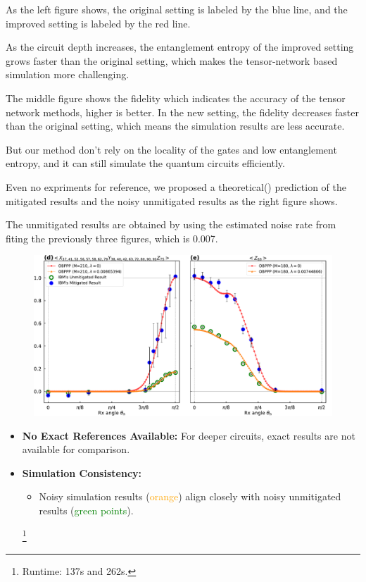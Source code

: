\documentclass[10pt]{beamer}
\begin{document}
\begin{CJK}{UTF8}{gbsn}
{ As the left figure shows, the original setting is labeled by the blue line, and the improved setting is labeled by the red line.

 As the circuit depth increases, the entanglement entropy of the improved setting grows faster than the original setting, which makes the tensor-network based simulation more challenging.

 The middle figure shows the fidelity which indicates the accuracy of the tensor network methods, higher is better. In the new setting, the fidelity decreases faster than the original setting, which means the simulation results are less accurate.

 But our method don't rely on the locality of the gates and low entanglement entropy, and it can still simulate the quantum circuits efficiently.

 Even no expriments for reference, we proposed a theoretical() prediction of the mitigated results and the noisy unmitigated results as the right figure shows.

 The unmitigated results are obtained by using the estimated noise rate from fiting the previously three figures, which is 0.007.
}


\begin{frame}[fragile]
  \begin{figure}
    \centering
    \includegraphics[width=\textwidth]{fig/simibm2.pdf}
  \end{figure}
  \begin{itemize}
    \item \textbf{No Exact References Available:} For deeper circuits, exact results are not available for comparison.
    \item \textbf{Simulation Consistency:}
    \begin{itemize}
        \item Noisy simulation results (\textcolor{orange}{orange}) align closely with noisy unmitigated results (\textcolor{green}{green points}).
  \end{itemize}
    \footnote{Runtime: 137s and 262s.}
\end{itemize}


\end{frame}
\end{CJK}
\end{document}
